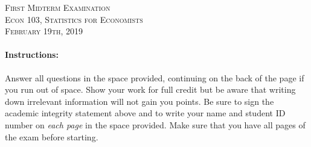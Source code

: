 \documentclass[addpoints,12pt]{exam}
\begin{document}
\begin{center}
\textsc{\large First Midterm Examination\\ \normalsize Econ 103, Statistics for Economists \\ \vspace{0.5em} February 19th, 2019}

\vspace{2em}



\end{center}


\vspace{2em}
\begin{center}
\end{center}
\vspace{0.2in}

\vspace{0.2in}

\noindent{}

\vspace{0.2in}

\noindent{}
\hfill
{}

\vspace{2em}

\begin{center}
  \gradetable[h][questions]
\end{center}

\vspace{2em}

\paragraph{Instructions:} Answer all questions in the space provided, continuing on the back of the page if you run out of space. Show your work for full credit but be aware that writing down irrelevant information will not gain you points. Be sure to sign the academic integrity statement above and to write your name and student ID number on \emph{each page} in the space provided. Make sure that you have all pages of the exam before starting.
\end{document}

